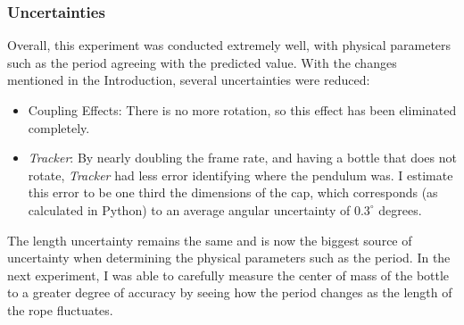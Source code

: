 \documentclass[%
 reprint,
 amsmath,amssymb
 aps,
]{revtex4-2}
\begin{document}
\subsubsection{Uncertainties}
Overall, this experiment was conducted extremely well, with physical parameters such as the period agreeing with the predicted value. With the changes mentioned in the Introduction, several uncertainties were reduced:
\begin{itemize}
    \item Coupling Effects: There is no more rotation, so this effect has been eliminated completely.
    \item \textit{Tracker}: By nearly doubling the frame rate, and having a bottle that does not rotate, \textit{Tracker} had less error identifying where the pendulum was. I estimate this error to be one third the dimensions of the cap, which corresponds (as calculated in Python) to an average angular uncertainty of $0.3^\circ$ degrees.
\end{itemize}
The length uncertainty remains the same and is now the biggest source of uncertainty when determining the physical parameters such as the period. In the next experiment, I was able to carefully measure the center of mass of the bottle to a greater degree of accuracy by seeing how the period changes as the length of the rope fluctuates.
\end{document}
